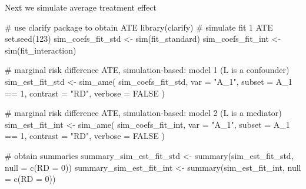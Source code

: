 \documentclass[
  singlecolumn]{article}
\newenvironment{Shaded}{\begin{snugshade}}{\end{snugshade}}
\newcommand{\AttributeTok}[1]{\textcolor[rgb]{0.40,0.45,0.13}{#1}}
\newcommand{\CommentTok}[1]{\textcolor[rgb]{0.37,0.37,0.37}{#1}}
\newcommand{\ConstantTok}[1]{\textcolor[rgb]{0.56,0.35,0.01}{#1}}
\newcommand{\DecValTok}[1]{\textcolor[rgb]{0.68,0.00,0.00}{#1}}
\newcommand{\FunctionTok}[1]{\textcolor[rgb]{0.28,0.35,0.67}{#1}}
\newcommand{\NormalTok}[1]{\textcolor[rgb]{0.00,0.23,0.31}{#1}}
\newcommand{\OtherTok}[1]{\textcolor[rgb]{0.00,0.23,0.31}{#1}}
\newcommand{\SpecialCharTok}[1]{\textcolor[rgb]{0.37,0.37,0.37}{#1}}
\newcommand{\StringTok}[1]{\textcolor[rgb]{0.13,0.47,0.30}{#1}}
\begin{document}
Next we simulate average treatment effect

\begin{Shaded}
\begin{Highlighting}[]
\CommentTok{\# use \textasciigrave{}clarify\textasciigrave{} package to obtain ATE}
\FunctionTok{library}\NormalTok{(clarify)}
\CommentTok{\# simulate fit 1 ATE}
\FunctionTok{set.seed}\NormalTok{(}\DecValTok{123}\NormalTok{)}
\NormalTok{sim\_coefs\_fit\_std }\OtherTok{\textless{}{-}} \FunctionTok{sim}\NormalTok{(fit\_standard)}
\NormalTok{sim\_coefs\_fit\_int }\OtherTok{\textless{}{-}} \FunctionTok{sim}\NormalTok{(fit\_interaction)}

\CommentTok{\# marginal risk difference ATE, simulation{-}based: model 1 (L is a confounder)}
\NormalTok{sim\_est\_fit\_std }\OtherTok{\textless{}{-}}
  \FunctionTok{sim\_ame}\NormalTok{(}
\NormalTok{    sim\_coefs\_fit\_std,}
    \AttributeTok{var =} \StringTok{"A\_1"}\NormalTok{,}
    \AttributeTok{subset =}\NormalTok{ A\_1 }\SpecialCharTok{==} \DecValTok{1}\NormalTok{,}
    \AttributeTok{contrast =} \StringTok{"RD"}\NormalTok{,}
    \AttributeTok{verbose =} \ConstantTok{FALSE}
\NormalTok{  )}

\CommentTok{\# marginal risk difference ATE, simulation{-}based: model 2 (L is a mediator)}
\NormalTok{sim\_est\_fit\_int }\OtherTok{\textless{}{-}}
  \FunctionTok{sim\_ame}\NormalTok{(}
\NormalTok{    sim\_coefs\_fit\_int,}
    \AttributeTok{var =} \StringTok{"A\_1"}\NormalTok{,}
    \AttributeTok{subset =}\NormalTok{ A\_1 }\SpecialCharTok{==} \DecValTok{1}\NormalTok{,}
    \AttributeTok{contrast =} \StringTok{"RD"}\NormalTok{,}
    \AttributeTok{verbose =} \ConstantTok{FALSE}
\NormalTok{  )}

\CommentTok{\# obtain summaries}
\NormalTok{summary\_sim\_est\_fit\_std }\OtherTok{\textless{}{-}}
  \FunctionTok{summary}\NormalTok{(sim\_est\_fit\_std, }\AttributeTok{null =} \FunctionTok{c}\NormalTok{(}\StringTok{\textasciigrave{}}\AttributeTok{RD}\StringTok{\textasciigrave{}} \OtherTok{=} \DecValTok{0}\NormalTok{))}
\NormalTok{summary\_sim\_est\_fit\_int }\OtherTok{\textless{}{-}}
  \FunctionTok{summary}\NormalTok{(sim\_est\_fit\_int, }\AttributeTok{null =} \FunctionTok{c}\NormalTok{(}\StringTok{\textasciigrave{}}\AttributeTok{RD}\StringTok{\textasciigrave{}} \OtherTok{=} \DecValTok{0}\NormalTok{))}


\end{Highlighting}
\end{Shaded}
\end{document}
